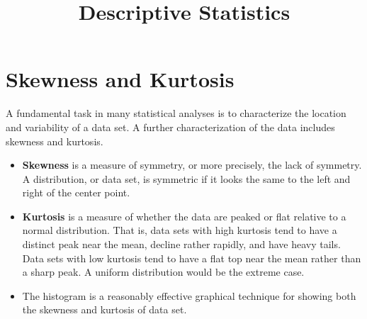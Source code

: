 \documentclass[12pt, a4paper]{report}
\title{Descriptive Statistics}
\begin{document}
\section*{Skewness and Kurtosis}

A fundamental task in many statistical analyses is to characterize the location and variability of a data set. A further characterization of the data includes skewness and kurtosis. 

\begin{itemize}
\item \textbf{Skewness} is a measure of symmetry, or more precisely, the lack of symmetry. A distribution, or data set, is symmetric if it looks the same to the left and right of the center point.

\item \textbf{Kurtosis} is a measure of whether the data are peaked or flat relative to a normal distribution. That is, data sets with high kurtosis tend to have a distinct peak near the mean, decline rather rapidly, and have heavy tails. Data sets with low kurtosis tend to have a flat top near the mean rather than a sharp peak. A uniform distribution would be the extreme case.

\item The histogram is a reasonably effective graphical technique for showing both the skewness and kurtosis of data set.

\end{itemize}
\end{document}
